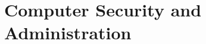 \documentclass[../main.tex]{subfiles}
\begin{document}
\chapter{Computer Security and Administration}
\label{ch:computer-security-administration}

\end{document}
